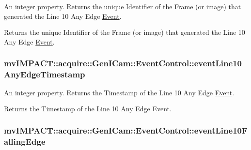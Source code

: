 An integer property. Returns the unique Identifier of the Frame (or image) that generated the Line 10 Any Edge \hyperlink{classmv_i_m_p_a_c_t_1_1acquire_1_1_event}{Event}. 

Returns the unique Identifier of the Frame (or image) that generated the Line 10 Any Edge \hyperlink{classmv_i_m_p_a_c_t_1_1acquire_1_1_event}{Event}. \hypertarget{classmv_i_m_p_a_c_t_1_1acquire_1_1_gen_i_cam_1_1_event_control_aded00caef3d6945a7184c37a0cba5fa5}{
\subsubsection[{event\+Line10\+Any\+Edge\+Timestamp}]{ mv\+I\+M\+P\+A\+C\+T\+::acquire\+::\+Gen\+I\+Cam\+::\+Event\+Control\+::event\+Line10\+Any\+Edge\+Timestamp}}\label{classmv_i_m_p_a_c_t_1_1acquire_1_1_gen_i_cam_1_1_event_control_aded00caef3d6945a7184c37a0cba5fa5}


An integer property. Returns the Timestamp of the Line 10 Any Edge \hyperlink{classmv_i_m_p_a_c_t_1_1acquire_1_1_event}{Event}. 

Returns the Timestamp of the Line 10 Any Edge \hyperlink{classmv_i_m_p_a_c_t_1_1acquire_1_1_event}{Event}. \hypertarget{classmv_i_m_p_a_c_t_1_1acquire_1_1_gen_i_cam_1_1_event_control_ab58e919e16105aabb860c6c63572c1e4}{
\subsubsection[{event\+Line10\+Falling\+Edge}]{ mv\+I\+M\+P\+A\+C\+T\+::acquire\+::\+Gen\+I\+Cam\+::\+Event\+Control\+::event\+Line10\+Falling\+Edge}}\label{classmv_i_m_p_a_c_t_1_1acquire_1_1_gen_i_cam_1_1_event_control_ab58e919e16105aabb860c6c63572c1e4}


